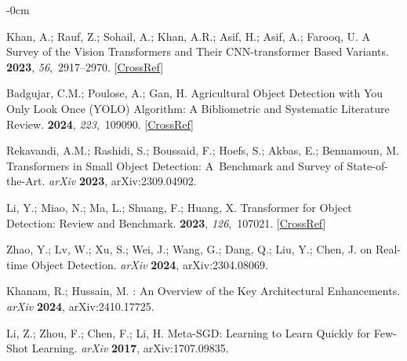\documentclass[12pt,a4paper,oneside]{report}
\newlength{\extralength}
\begin{document}
\begin{adjustwidth}{-\extralength}{0cm}
\begin{thebibliography}{999}
Khan, A.; Rauf, Z.; Sohail, A.; Khan, A.R.; Asif, H.; Asif, A.; Farooq, U.
\newblock A Survey of the Vision Transformers and Their {{CNN-transformer}}
Based Variants.
 {\bf 2023}, {\em
56},~2917--2970. [\href{http://dx.doi.org/10.1007/s10462-023-10595-0}{CrossRef}]

Badgujar, C.M.; Poulose, A.; Gan, H.
\newblock Agricultural Object Detection with {{You Only Look Once}} ({{YOLO}})
{{Algorithm}}: {{A}} Bibliometric and Systematic Literature Review.
 {\bf 2024}, {\em
223},~109090. [\href{http://dx.doi.org/10.1016/j.compag.2024.109090}{CrossRef}]

Rekavandi, A.M.; Rashidi, S.; Boussaid, F.; Hoefs, S.; Akbas, E.; {Bennamoun},
M.
\newblock Transformers in {{Small Object Detection}}: \mbox{{{A Benchmark}}} and
{{Survey}} of {{State-of-the-Art}}. {\em arXiv} {\bf 2023}, arXiv:2309.04902.

Li, Y.; Miao, N.; Ma, L.; Shuang, F.; Huang, X.
\newblock Transformer for Object Detection: {{Review}} and Benchmark.
 {\bf 2023},
{\em 126},~107021. [\href{http://dx.doi.org/10.1016/j.engappai.2023.107021}{CrossRef}]

Zhao, Y.; Lv, W.; Xu, S.; Wei, J.; Wang, G.; Dang, Q.; Liu, Y.; Chen, J.
 on {{Real-time Object Detection}}. {\em arXiv} {\bf2024}, arXiv:2304.08069.

Khanam, R.; Hussain, M.
: {{An Overview}} of the {{Key Architectural
Enhancements}}. {\em arXiv} {\bf2024}, arXiv:2410.17725. 

Li, Z.; Zhou, F.; Chen, F.; Li, H.
\newblock Meta-{{SGD}}: {{Learning}} to {{Learn Quickly}} for {{Few-Shot
Learning}}. {\em arXiv} {\bf2017}, arXiv:1707.09835. 


\end{thebibliography}
\end{adjustwidth}
\end{document}
